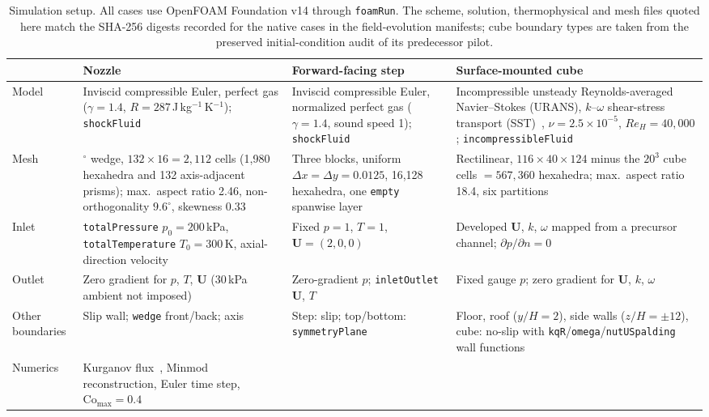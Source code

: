 \documentclass[11pt]{article}
\begin{document}
\begin{table}[!htbp]
\centering
\caption{Simulation setup. All cases use OpenFOAM Foundation v14 through
\texttt{foamRun}. The scheme, solution, thermophysical and mesh files quoted
here match the SHA-256 digests recorded for the native cases in the
field-evolution manifests; cube boundary types are taken from the preserved
initial-condition audit of its predecessor pilot.}
\label{tab:setup}
\small
\setlength{\tabcolsep}{3.5pt}
\begin{tabularx}{\linewidth}{@{}>{\raggedright\arraybackslash}p{2.05cm}
  >{\raggedright\arraybackslash}X >{\raggedright\arraybackslash}X
  >{\raggedright\arraybackslash}X@{}}
\toprule
 & Nozzle & Forward-facing step & Surface-mounted cube \\
\midrule
Model & Inviscid compressible Euler, perfect gas ($\gamma=1.4$, $R=287$\,J\,kg$^{-1}$\,K$^{-1}$); \texttt{shockFluid}
 & Inviscid compressible Euler, normalized perfect gas ($\gamma=1.4$, sound speed 1); \texttt{shockFluid}
 & Incompressible unsteady Reynolds-averaged Navier--Stokes (URANS), $k$--$\omega$ shear-stress transport (SST)~\cite{menter1994sst}, $\nu=2.5\times10^{-5}$, $Re_H=40{,}000$; \texttt{incompressibleFluid} \\
Mesh & 5$^\circ$ wedge, $132\times16=2{,}112$ cells (1,980 hexahedra and 132 axis-adjacent prisms); max.\ aspect ratio 2.46, non-orthogonality $9.6^\circ$, skewness 0.33
 & Three blocks, uniform $\Delta x=\Delta y=0.0125$, 16,128 hexahedra, one \texttt{empty} spanwise layer
 & Rectilinear, $116\times40\times124$ minus the $20^3$ cube cells $=567{,}360$ hexahedra; max.\ aspect ratio 18.4, six partitions \\
Inlet & \texttt{totalPressure} $p_0=200$\,kPa, \texttt{totalTemperature} $T_0=300$\,K, axial-direction velocity
 & Fixed $p=1$, $T=1$, $\mathbf{U}=(2,0,0)$
 & Developed $\mathbf{U}$, $k$, $\omega$ mapped from a precursor channel; $\partial p/\partial n=0$ \\
Outlet & Zero gradient for $p$, $T$, $\mathbf{U}$ (30\,kPa ambient not imposed)
 & Zero-gradient $p$; \texttt{inletOutlet} $\mathbf{U}$, $T$
 & Fixed gauge $p$; zero gradient for $\mathbf{U}$, $k$, $\omega$ \\
Other boundaries & Slip wall; \texttt{wedge} front/back; axis
 & Step: slip; top/bottom: \texttt{symmetryPlane}
 & Floor, roof ($y/H=2$), side walls ($z/H=\pm12$), cube: no-slip with \texttt{kqR}/\texttt{omega}/\texttt{nutUSpalding} wall functions \\
Numerics & Kurganov flux~\cite{kurganov2000central}, Minmod reconstruction, Euler time step, $\mathrm{Co}_{\max}=0.4$

\end{tabularx}
\end{table}
\end{document}
